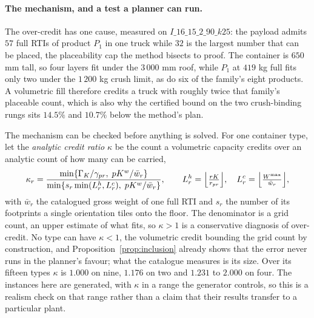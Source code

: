 \paragraph{The mechanism, and a test a planner can run.}
The over-credit has one cause, measured on $I\_16\_15\_2\_90\_k25$: the
payload admits $57$ full RTIs of product $P_{1}$ in one truck while
$32$ is the largest number that can be placed, the placeability cap the
method bisects to proof. The container is $650$ mm tall, so four layers
fit under the $3\,000$ mm roof, while $P_{1}$ at $419$ kg full fits
only two under the $1\,200$ kg crush limit, as do six of the family's
eight products. A volumetric fill therefore credits a truck with
roughly twice that family's placeable count, which is also why the
certified bound on the two crush-binding rungs sits $14.5\%$ and
$10.7\%$ below the method's plan.

The mechanism can be checked before anything is solved. For one
container type, let the \emph{analytic credit ratio} $\kappa$ be the
count a volumetric capacity credits over an analytic count of how many
can be carried,
\begin{equation}
\kappa_{r}=
\frac{\min\{\Gamma_{K}/\gamma_{pr},\;pK^{w}/\bar w_{r}\}}
     {\min\{s_{r}\min(L^{h}_{r},L^{c}_{r}),\;pK^{w}/\bar w_{r}\}},
\qquad
L^{h}_{r}=\Bigl\lfloor\tfrac{rK}{r_{pr}}\Bigr\rfloor,
\quad
L^{c}_{r}=\Bigl\lfloor\tfrac{W^{\max}}{\bar w_{r}}\Bigr\rfloor,
\label{eq:kappa}
\end{equation}
with $\bar w_{r}$ the catalogued gross weight of one full RTI and
$s_{r}$ the number of its footprints a single orientation tiles onto
the floor. The denominator is a grid count, an upper estimate of what
fits, so $\kappa>1$ is a conservative diagnosis of over-credit. No
type can have $\kappa<1$, the volumetric credit bounding the grid
count by construction, and Proposition~\ref{prop:inclusion} already
shows that the error never runs in the planner's favour; what the
catalogue measures is its size. Over its fifteen types $\kappa$ is
$1.000$ on nine, $1.176$ on two and $1.231$ to $2.000$ on four.
The instances here are generated, with $\kappa$ in a range the generator
controls, so this is a realism check on that range rather than a claim
that their results transfer to a particular plant.
